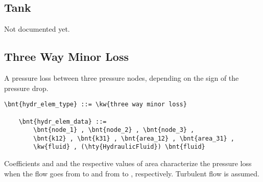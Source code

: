 \subsection{Tank}
\label{sec:EL:HYDR:TANK}
Not documented yet.



\subsection{Three Way Minor Loss}
A pressure loss between three pressure nodes,
depending on the sign of the pressure drop.
\label{sec:EL:HYDR:THREE_WAY_MINOR_LOSS}
\begin{Verbatim}[commandchars=\\\{\}]
    \bnt{hydr_elem_type} ::= \kw{three way minor loss}

    \bnt{hydr_elem_data} ::=
        \bnt{node_1} , \bnt{node_2} , \bnt{node_3} ,
        \bnt{k12} , \bnt{k31} , \bnt{area_12} , \bnt{area_31} ,
        \kw{fluid} , (\hty{HydraulicFluid}) \bnt{fluid}
\end{Verbatim}
Coefficients  and  and the respective values of area
characterize the pressure loss when the flow goes
from  to  and from  to ,
respectively.
Turbulent flow is assumed.




